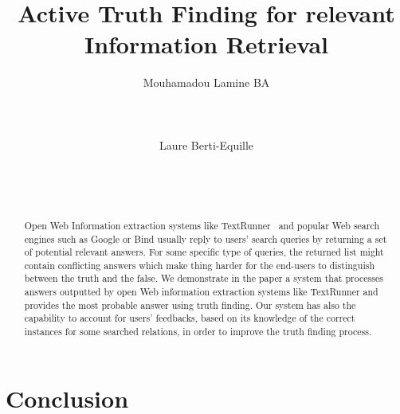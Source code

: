 \documentclass{sig-alternate}
\begin{document}
\conferenceinfo{}{}

\title{Active Truth Finding for relevant Information Retrieval}

\author{
\alignauthor
Mouhamadou Lamine BA\\
       \\
       \\
       \\
\alignauthor
Laure Berti-Equille\\
       \\
       \\
       \\
}


\maketitle

\begin{abstract}
Open Web Information extraction systems like TextRunner~\cite{Yates07}
and popular Web search engines such as Google or Bind usually reply to
users' search queries by returning a set of potential relevant answers.
For some specific type of queries, the returned list might contain conflicting 
answers which make thing harder for the end-users to distinguish between the truth
and the false.
We demonstrate in the paper a system that processes answers outputted 
by open Web information extraction systems like TextRunner and provides 
the most probable answer using truth finding. Our system has also the 
capability to account for users' feedbacks, based on its knowledge of the 
correct instances for some searched relations, in order to improve the truth
finding process.
\end{abstract}











\section{Conclusion}
\cite{*}


\end{document}
